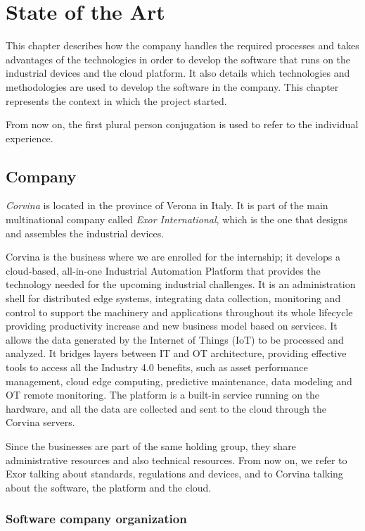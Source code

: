 \chapter{State of the Art}

This chapter describes how the company handles the required processes and takes advantages of the technologies in order to develop the software that runs on the industrial devices and the cloud platform. It also details which technologies and methodologies are used to develop the software in the company. This chapter represents the context in which the project started.

From now on, the first plural person conjugation is used to refer to the individual experience.

\section{Company}

\textit{Corvina} is located in the province of Verona in Italy. It is part of the main multinational company called \textit{Exor International}, which is the one that designs and assembles the industrial devices.

Corvina is the business where we are enrolled for the internship; it develops a cloud-based, all-in-one Industrial Automation Platform that provides the technology needed for the upcoming industrial challenges. It is an administration shell for distributed edge systems, integrating data collection, monitoring and control to support the machinery and applications throughout its whole lifecycle providing productivity increase and new business model based on services. It allows the data generated by the Internet of Things (IoT) to be processed and analyzed. It bridges layers between IT and OT architecture, providing effective tools to access all the Industry 4.0 benefits, such as asset performance management, cloud edge computing, predictive maintenance, data modeling and OT remote monitoring. The platform is a built-in service running on the hardware, and all the data are collected and sent to the cloud through the Corvina servers.

Since the businesses are part of the same holding group, they share administrative resources and also technical resources. From now on, we refer to Exor talking about standards, regulations and devices, and to Corvina talking about the software, the platform and the cloud.

\subsection{Software company organization}

